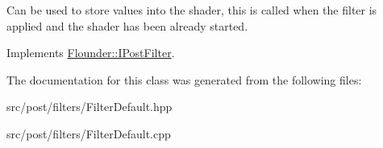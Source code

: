 Can be used to store values into the shader, this is called when the filter is applied and the shader has been already started. 



Implements \hyperlink{class_flounder_1_1_i_post_filter_a20420ec0a9bac67437740552bea9ab74}{Flounder\+::\+I\+Post\+Filter}.



The documentation for this class was generated from the following files\+:\begin{DoxyCompactItemize}
\item 
src/post/filters/Filter\+Default.\+hpp\item 
src/post/filters/Filter\+Default.\+cpp\end{DoxyCompactItemize}
